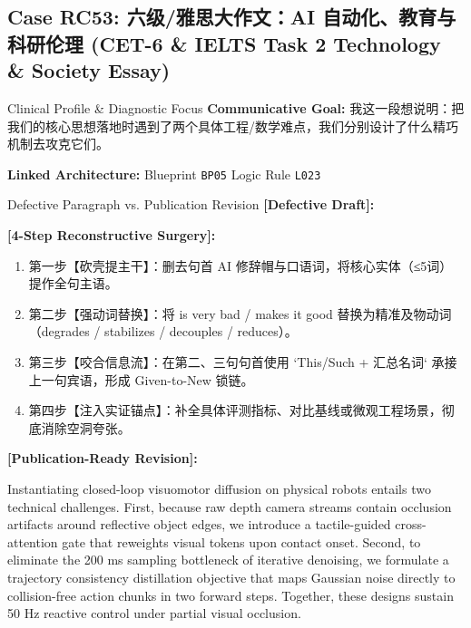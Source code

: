 \subsection{Case RC53: 六级/雅思大作文：AI 自动化、教育与科研伦理 (CET-6 \& IELTS Task 2 Technology \& Society Essay)}\label{case:RC53}
\begin{ConceptBox}{Clinical Profile \& Diagnostic Focus}
\textbf{Communicative Goal:} 我这一段想说明：把我们的核心思想落地时遇到了两个具体工程/数学难点，我们分别设计了什么精巧机制去攻克它们。\par
\textbf{Linked Architecture:} Blueprint \texttt{BP05} \enspace\textbar\enspace Logic Rule \texttt{L023}
\end{ConceptBox}
\begin{ExampleBox}{Defective Paragraph vs. Publication Revision}
\textbf{\color{TargetHighlight}[Defective Draft]:}\par
{}\par\vspace{6pt}
\textbf{\color{AcadForest}[4-Step Reconstructive Surgery]:}
\begin{enumerate}[label=\textbf{\color{AcadNavy}Step \arabic*:}, leftmargin=2em]
  \item 第一步【砍壳提主干】：删去句首 AI 修辞帽与口语词，将核心实体（≤5词）提作全句主语。
  \item 第二步【强动词替换】：将 is very bad / makes it good 替换为精准及物动词（degrades / stabilizes / decouples / reduces）。
  \item 第三步【咬合信息流】：在第二、三句句首使用 `This/Such + 汇总名词` 承接上一句宾语，形成 Given-to-New 锁链。
  \item 第四步【注入实证锚点】：补全具体评测指标、对比基线或微观工程场景，彻底消除空洞夸张。
\end{enumerate}\vspace{4pt}
\textbf{\color{AcadNavy}[Publication-Ready Revision]:}\par
Instantiating closed-loop visuomotor diffusion on physical robots entails two technical challenges. First, because raw depth camera streams contain occlusion artifacts around reflective object edges, we introduce a tactile-guided cross-attention gate that reweights visual tokens upon contact onset. Second, to eliminate the 200 ms sampling bottleneck of iterative denoising, we formulate a trajectory consistency distillation objective that maps Gaussian noise directly to collision-free action chunks in two forward steps. Together, these designs sustain 50 Hz reactive control under partial visual occlusion.
\end{ExampleBox}
